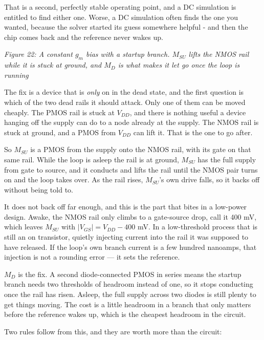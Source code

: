 That is a second, perfectly stable operating point, and a DC simulation
is entitled to find either one. Worse, a DC simulation often finds the
one you wanted, because the solver started its guess somewhere helpful -
and then the chip comes back and the reference never wakes up.


{
\centering
{}
}

\emph{Figure 22: A constant \(g_m\) bias with a startup branch.
\(M_{SU}\) lifts the NMOS rail while it is stuck at ground, and \(M_D\)
is what makes it let go once the loop is running}

The fix is a device that is \emph{only} on in the dead state, and the
first question is which of the two dead rails it should attack. Only one
of them can be moved cheaply. The PMOS rail is stuck at \(V_{DD}\), and
there is nothing useful a device hanging off the supply can do to a node
already at the supply. The NMOS rail is stuck at ground, and a PMOS from
\(V_{DD}\) can lift it. That is the one to go after.

So \(M_{SU}\) is a PMOS from the supply onto the NMOS rail, with its
gate on that same rail. While the loop is asleep the rail is at ground,
\(M_{SU}\) has the full supply from gate to source, and it conducts and
lifts the rail until the NMOS pair turns on and the loop takes over. As
the rail rises, \(M_{SU}\)'s own drive falls, so it backs off without
being told to.

It does not back off far enough, and this is the part that bites in a
low-power design. Awake, the NMOS rail only climbs to a gate-source
drop, call it 400 mV, which leaves \(M_{SU}\) with
\(\vert V_{GS}\vert = V_{DD} - 400\) mV. In a low-threshold process that
is still an on transistor, quietly injecting current into the rail it
was supposed to have released. If the loop's own branch current is a few
hundred nanoamps, that injection is not a rounding error --- it sets the
reference.

\(M_D\) is the fix. A second diode-connected PMOS in series means the
startup branch needs two thresholds of headroom instead of one, so it
stops conducting once the rail has risen. Asleep, the full supply across
two diodes is still plenty to get things moving. The cost is a little
headroom in a branch that only matters before the reference wakes up,
which is the cheapest headroom in the circuit.

Two rules follow from this, and they are worth more than the circuit:

